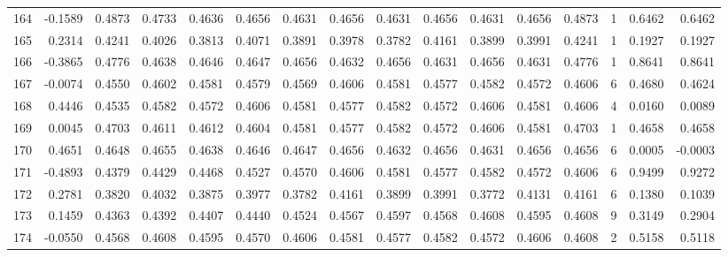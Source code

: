 \begin{tabular}{lrrrrrrrrrrrrrrr}
164 &     -0.1589 &  0.4873 &  0.4733 &  0.4636 &  0.4656 &  0.4631 &  0.4656 &  0.4631 &  0.4656 &  0.4631 &   0.4656 &     0.4873 &      1 &                    0.6462 &                     0.6462 \\
165 &      0.2314 &  0.4241 &  0.4026 &  0.3813 &  0.4071 &  0.3891 &  0.3978 &  0.3782 &  0.4161 &  0.3899 &   0.3991 &     0.4241 &      1 &                    0.1927 &                     0.1927 \\
166 &     -0.3865 &  0.4776 &  0.4638 &  0.4646 &  0.4647 &  0.4656 &  0.4632 &  0.4656 &  0.4631 &  0.4656 &   0.4631 &     0.4776 &      1 &                    0.8641 &                     0.8641 \\
167 &     -0.0074 &  0.4550 &  0.4602 &  0.4581 &  0.4579 &  0.4569 &  0.4606 &  0.4581 &  0.4577 &  0.4582 &   0.4572 &     0.4606 &      6 &                    0.4680 &                     0.4624 \\
168 &      0.4446 &  0.4535 &  0.4582 &  0.4572 &  0.4606 &  0.4581 &  0.4577 &  0.4582 &  0.4572 &  0.4606 &   0.4581 &     0.4606 &      4 &                    0.0160 &                     0.0089 \\
169 &      0.0045 &  0.4703 &  0.4611 &  0.4612 &  0.4604 &  0.4581 &  0.4577 &  0.4582 &  0.4572 &  0.4606 &   0.4581 &     0.4703 &      1 &                    0.4658 &                     0.4658 \\
170 &      0.4651 &  0.4648 &  0.4655 &  0.4638 &  0.4646 &  0.4647 &  0.4656 &  0.4632 &  0.4656 &  0.4631 &   0.4656 &     0.4656 &      6 &                    0.0005 &                    -0.0003 \\
171 &     -0.4893 &  0.4379 &  0.4429 &  0.4468 &  0.4527 &  0.4570 &  0.4606 &  0.4581 &  0.4577 &  0.4582 &   0.4572 &     0.4606 &      6 &                    0.9499 &                     0.9272 \\
172 &      0.2781 &  0.3820 &  0.4032 &  0.3875 &  0.3977 &  0.3782 &  0.4161 &  0.3899 &  0.3991 &  0.3772 &   0.4131 &     0.4161 &      6 &                    0.1380 &                     0.1039 \\
173 &      0.1459 &  0.4363 &  0.4392 &  0.4407 &  0.4440 &  0.4524 &  0.4567 &  0.4597 &  0.4568 &  0.4608 &   0.4595 &     0.4608 &      9 &                    0.3149 &                     0.2904 \\
174 &     -0.0550 &  0.4568 &  0.4608 &  0.4595 &  0.4570 &  0.4606 &  0.4581 &  0.4577 &  0.4582 &  0.4572 &   0.4606 &     0.4608 &      2 &                    0.5158 &                     0.5118 \\

\end{tabular}
